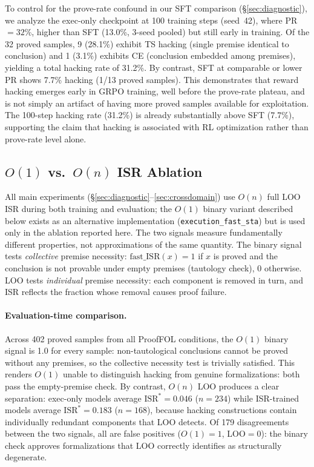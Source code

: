To control for the prove-rate confound in our SFT comparison (\S\ref{sec:diagnostic}), we analyze the exec-only checkpoint at 100 training steps (seed~42), where PR${=}32$\%, higher than SFT (13.0\%, 3-seed pooled) but still early in training.
Of the 32 proved samples, 9 (28.1\%) exhibit TS hacking (single premise identical to conclusion) and 1 (3.1\%) exhibits CE (conclusion embedded among premises), yielding a total hacking rate of 31.2\%.
By contrast, SFT at comparable or lower PR shows 7.7\% hacking (1/13 proved samples).
This demonstrates that reward hacking emerges early in GRPO training, well before the prove-rate plateau, and is not simply an artifact of having more proved samples available for exploitation.
The 100-step hacking rate (31.2\%) is already substantially above SFT (7.7\%), supporting the claim that hacking is associated with RL optimization rather than prove-rate level alone.

\subsection{$O(1)$ vs.\ $O(n)$ ISR Ablation}
\label{app:o1-ablation}

All main experiments (\S\ref{sec:diagnostic}--\ref{sec:crossdomain}) use $O(n)$ full LOO ISR during both training and evaluation; the $O(1)$ binary variant described below exists as an alternative implementation (\texttt{execution\_fast\_sta}) but is used only in the ablation reported here.
The two signals measure fundamentally different properties, not approximations of the same quantity.
The binary signal tests \emph{collective} premise necessity: $\text{fast\_ISR}(x) = 1$ if $x$ is proved and the conclusion is not provable under empty premises (tautology check), $0$ otherwise.
LOO tests \emph{individual} premise necessity: each component is removed in turn, and ISR reflects the fraction whose removal causes proof failure.

\paragraph{Evaluation-time comparison.}
Across 402 proved samples from all ProofFOL conditions, the $O(1)$ binary signal is 1.0 for every sample: non-tautological conclusions cannot be proved without any premises, so the collective necessity test is trivially satisfied.
This renders $O(1)$ unable to distinguish hacking from genuine formalizations: both pass the empty-premise check.
By contrast, $O(n)$ LOO produces a clear separation: exec-only models average $\text{ISR}^*{=}0.046$ ($n{=}234$) while ISR-trained models average $\text{ISR}^*{=}0.183$ ($n{=}168$), because hacking constructions contain individually redundant components that LOO detects.
Of 179 disagreements between the two signals, all are false positives ($O(1){=}1$, LOO${=}0$): the binary check approves formalizations that LOO correctly identifies as structurally degenerate.

